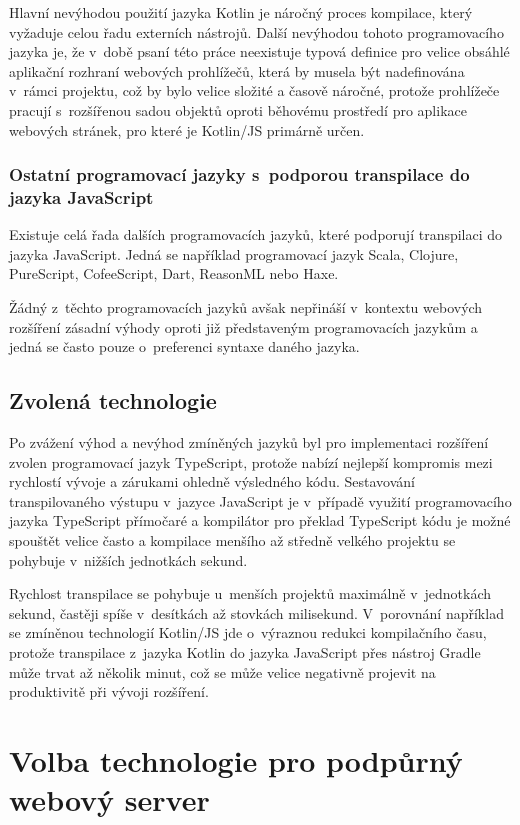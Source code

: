 Hlavní nevýhodou použití jazyka Kotlin je náročný proces kompilace, který vyžaduje celou řadu externích nástrojů. Další nevýhodou tohoto programovacího jazyka je, že v~době psaní této práce neexistuje typová definice pro velice obsáhlé aplikační rozhraní webových prohlížečů, která by musela být nadefinována v~rámci projektu, což by bylo velice složité a časově náročné, protože prohlížeče pracují s~rozšířenou sadou objektů oproti běhovému prostředí pro aplikace webových stránek, pro které je Kotlin/JS primárně určen.

\subsubsection{Ostatní programovací jazyky s~podporou transpilace do jazyka JavaScript}

Existuje celá řada dalších programovacích jazyků, které podporují transpilaci do jazyka JavaScript. Jedná se například programovací jazyk Scala, Clojure, PureScript, CofeeScript, Dart, ReasonML nebo Haxe.

Žádný z~těchto programovacích jazyků avšak nepřináší v~kontextu webových rozšíření zásadní výhody oproti již představeným programovacích jazykům a jedná se často pouze o~preferenci syntaxe daného jazyka.

\subsection{Zvolená technologie}

Po zvážení výhod a nevýhod zmíněných jazyků byl pro implementaci rozšíření zvolen programovací jazyk TypeScript, protože nabízí nejlepší kompromis mezi rychlostí vývoje a zárukami ohledně výsledného kódu. Sestavování transpilovaného výstupu v~jazyce JavaScript je v~případě využití programovacího jazyka TypeScript přímočaré a kompilátor pro překlad TypeScript kódu je možné spouštět velice často a kompilace menšího až středně velkého projektu se pohybuje v~nižších jednotkách sekund. 

Rychlost transpilace se pohybuje u~menších projektů maximálně v~jednotkách sekund, častěji spíše v~desítkách až stovkách milisekund. V~porovnání například se zmíněnou technologií Kotlin/JS jde o~výraznou redukci kompilačního času, protože transpilace z~jazyka Kotlin do jazyka JavaScript přes nástroj Gradle může trvat až několik minut, což se může velice negativně projevit na produktivitě při vývoji rozšíření.

\section{Volba technologie pro podpůrný webový server}

